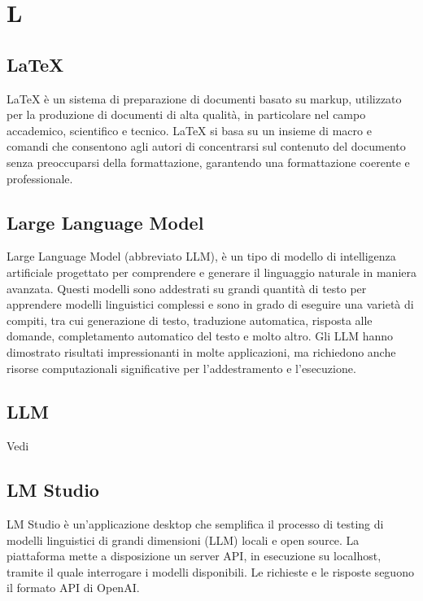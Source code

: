 \section{L}

\vspace{2em}
\subsection*{LaTeX}
LaTeX è un sistema di preparazione di documenti basato su markup, utilizzato per la produzione di documenti di alta qualità, in particolare nel campo accademico, scientifico e tecnico. LaTeX si basa su un insieme di macro e comandi che consentono agli autori di concentrarsi sul contenuto del documento senza preoccuparsi della formattazione, garantendo una formattazione coerente e professionale.

\vspace{2em}
\subsection*{Large Language Model}
Large Language Model (abbreviato LLM), è un tipo di modello di intelligenza artificiale progettato per comprendere e generare il linguaggio naturale in maniera avanzata. Questi modelli sono addestrati su grandi quantità di testo per apprendere modelli linguistici complessi e sono in grado di eseguire una varietà di compiti, tra cui generazione di testo, traduzione automatica, risposta alle domande, completamento automatico del testo e molto altro. Gli LLM hanno dimostrato risultati impressionanti in molte applicazioni, ma richiedono anche risorse computazionali significative per l'addestramento e l'esecuzione.

\vspace{2em}
\subsection*{LLM}
\par Vedi 

\vspace{2em}
\subsection*{LM Studio}
LM Studio è un'applicazione desktop che semplifica il processo di testing di modelli linguistici di grandi dimensioni (LLM) locali e open source. La piattaforma mette a disposizione un server API, in esecuzione su localhost, tramite il quale interrogare i modelli disponibili. Le richieste e le risposte seguono il formato API di OpenAI.

